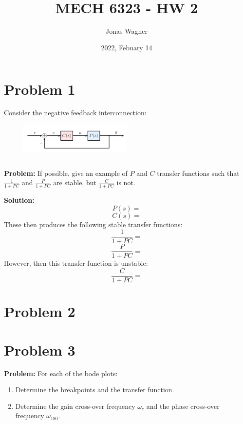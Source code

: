 \documentclass[letter]{article}
\title{MECH 6323 - HW 2}
\author{Jonas Wagner}
\date{2022, Febuary 14}
\numberwithin{equation}{section}
\begin{document}
	

\maketitle

\tableofcontents

\newpage
\section{Problem 1}
Consider the negative feedback interconnection:
\begin{figure}[ht]
	\centering
	\includegraphics[width=0.5\textwidth]{figs/pblm1.png}
\end{figure}
\subsection{}
\textbf{Problem:} 
If possible, give an example of $P$ and $C$ transfer functions such that $\frac{1}{1+PC}$ and $\frac{P}{1+PC}$ are stable, but $\frac{C}{1+PC}$ is not.

\textbf{Solution:}
\[
	P(s) = 
\]\[
	C(s) = 
\]
These then produces the following stable transfer functions:
\[
	\frac{1}{1+PC} = 
\]\[
	\frac{P}{1+PC} = 
\]
However, then this transfer function is unstable:
\[
	\frac{C}{1+PC} = 
\]










\newpage
\section{Problem 2}




\newpage
\section{Problem 3}
\textbf{Problem:}
For each of the bode plots:
\begin{enumerate}
	\item Determine the breakpoints and the transfer function.
	\item Determine the gain cross-over frequency $\omega_c$ and the phase cross-over frequency $\omega_{180}$.
\end{enumerate}
\end{document}
